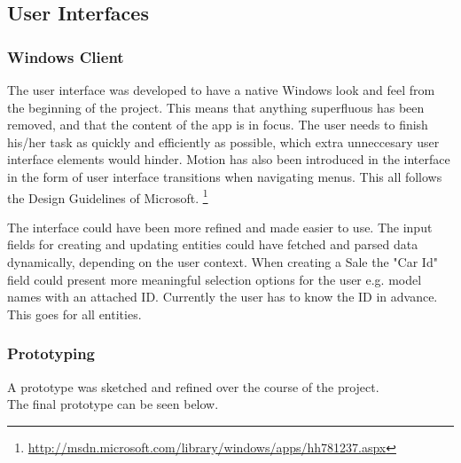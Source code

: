 \subsection{User Interfaces}

\subsubsection{Windows Client}
The user interface was developed to have a native Windows look and feel from the beginning of the project. 
This means that anything superfluous has been removed, and that the content of the app is in focus. 
The user needs to finish his/her task as quickly and efficiently as possible, which extra unneccesary user interface elements would hinder.
Motion has also been introduced in the interface in the form of user interface transitions when navigating menus. 
This all follows the Design Guidelines of Microsoft. \footnote{\hyperref[Microsoft Design Principles]{http://msdn.microsoft.com/library/windows/apps/hh781237.aspx}}

The interface could have been more refined and made easier to use. The input fields for creating and updating entities could have fetched and parsed data dynamically, depending on the user context. 
When creating a Sale the "Car Id" field could present more meaningful selection options for the user e.g. model names with an attached ID. Currently the user has to know the ID in advance. This goes for all entities.

\subsubsection{Prototyping}
A prototype was sketched and refined over the course of the project.\\
The final prototype can be seen below.\\

